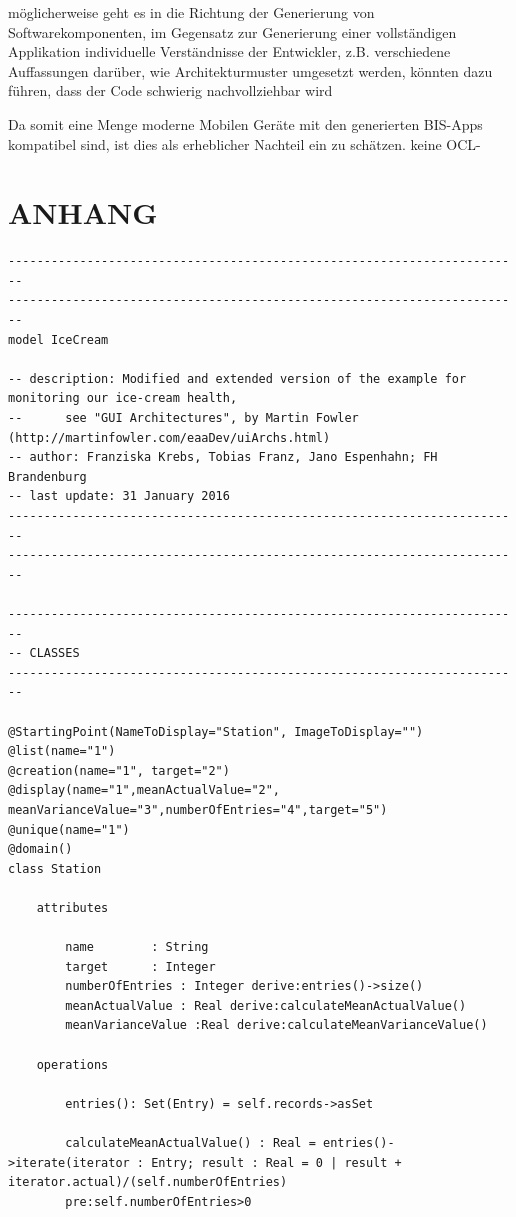 \documentclass[a4paper,twoside]{article}
\begin{document}
möglicherweise geht es in die Richtung der Generierung von Softwarekomponenten, im Gegensatz zur Generierung einer vollständigen Applikation
individuelle Verständnisse der Entwickler, z.B. verschiedene Auffassungen darüber, wie Architekturmuster umgesetzt werden, könnten dazu führen, dass der Code schwierig nachvollziehbar wird

 Da somit eine Menge moderne Mobilen Geräte mit den generierten BIS-Apps kompatibel sind, ist dies als erheblicher Nachteil ein zu schätzen.
keine OCL-
\vfill

{\small
}
\newpage
\section*{\uppercase{Anhang}}
\onecolumn
\begin{lstlisting}[caption={Vollständige USE-Spezifikation des IceCream Modells},label=lst:completeUSE]
------------------------------------------------------------------------
------------------------------------------------------------------------
model IceCream

-- description: Modified and extended version of the example for monitoring our ice-cream health,
-- 		see "GUI Architectures", by Martin Fowler (http://martinfowler.com/eaaDev/uiArchs.html)
-- author: Franziska Krebs, Tobias Franz, Jano Espenhahn; FH Brandenburg
-- last update: 31 January 2016
------------------------------------------------------------------------
------------------------------------------------------------------------

------------------------------------------------------------------------
-- CLASSES
------------------------------------------------------------------------

@StartingPoint(NameToDisplay="Station", ImageToDisplay="")
@list(name="1")
@creation(name="1", target="2")
@display(name="1",meanActualValue="2", meanVarianceValue="3",numberOfEntries="4",target="5")
@unique(name="1")
@domain()
class Station

	attributes

		name		: String
		target		: Integer
		numberOfEntries : Integer derive:entries()->size()
		meanActualValue : Real derive:calculateMeanActualValue()
		meanVarianceValue :Real derive:calculateMeanVarianceValue()
		
	operations
	
		entries(): Set(Entry) = self.records->asSet
	  
		calculateMeanActualValue() : Real = entries()->iterate(iterator : Entry; result : Real = 0 | result + iterator.actual)/(self.numberOfEntries) 
		pre:self.numberOfEntries>0


\end{lstlisting}
\end{document}
